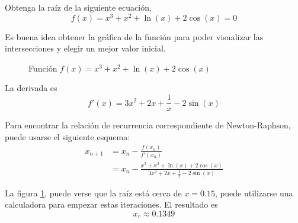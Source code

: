\begin{ex}
    Obtenga la raíz de la siguiente ecuación,
    \[
        f(x) = x^3 + x^2 + \ln(x) + 2 \cos(x) = 0
    \]

    \begin{solution}

        Es buena idea obtener la gráfica de la función para poder visualizar
        las intersecciones y elegir un mejor valor inicial.

        \begin{figure}
            \centering
            \caption{Función $f(x) = x^3 + x^2 + \ln(x) + 2 \cos(x)$}
            \label{fig:ejercicio-newton}
        \end{figure}


        La derivada es 
        \[
            f'(x) = 3x^2 + 2x + \frac{1}{x} - 2 \sin(x)
        \]

        Para encontrar la relación de recurrencia correspondiente de
        Newton-Raphson, puede usarse el siguiente esquema:
        \begin{align*}
            x_{n+1} &= x_n - \frac{f(x_n)}{f'(x_n)} \\
                &= x_n - \frac{x^3 + x^2 + \ln(x) + 2
                \cos(x)}{3x^2 + 2x + \frac{1}{x} - 2 \sin(x)}
        \end{align*}

        La figura \ref{fig:ejercicio-newton}, puede verse que la raíz está
        cerca de $x = 0.15$, puede utilizarse una calculadora para empezar
        estas iteraciones. El resultado es
        \[
            \boxed{x_r \approx 0.1349}
        \]

    \end{solution}

\end{ex}

